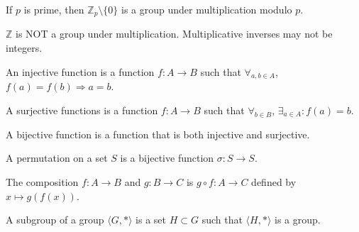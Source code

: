 \documentclass[crop=false,class=article,oneside]{standalone}
\begin{document}
            \begin{theorem}
                If $p$ is prime, then
                $\mathbb{Z}_p\setminus \{0\}$ is a group
                under multiplication modulo $p$.
            \end{theorem}
            \begin{remark}
                $\mathbb{Z}$ is NOT a group under
                multiplication. Multiplicative inverses may
                not be integers.
            \end{remark}
            \begin{definition}
                An injective function is a function
                $f:A\rightarrow B$ such that
                $\forall_{a,b\in A}$,
                $f(a)=f(b)\Rightarrow a=b$.
            \end{definition}
            \begin{definition}
                A surjective functions is a function
                $f:A\rightarrow B$ such that
                $\forall_{b\in B}$,
                $\exists_{a\in A}:f(a)=b$.
            \end{definition}
            \begin{definition}
                A bijective function is a function that
                is both injective and surjective.
            \end{definition}
            \begin{definition}
                A permutation on a set $S$ is a
                bijective function $\sigma:S\rightarrow S$.
            \end{definition}
            \begin{definition}
                The composition $f:A\rightarrow B$ and
                $g:B\rightarrow C$ is $g\circ f:A\rightarrow C$
                defined by $x\mapsto g(f(x))$.
            \end{definition}
            \begin{definition}
                A subgroup of a group $\langle G,*\rangle$ is
                a set $H\subset G$ such that $\langle H,*\rangle$
                is a group.
            \end{definition}
\end{document}
